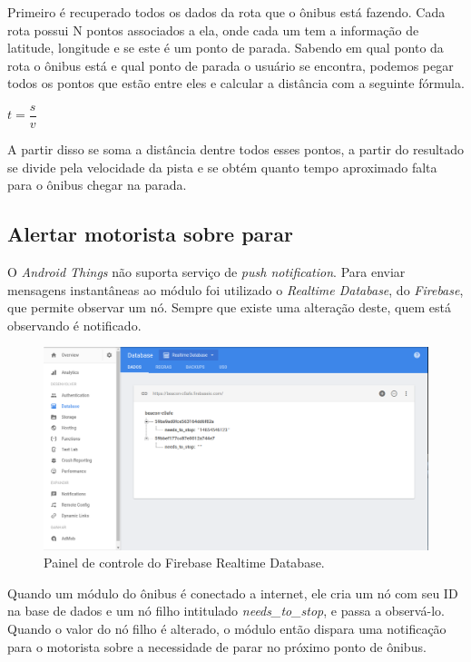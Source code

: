 \documentclass[
	12pt,				%
	oneside,			%
	a4paper,			%
	brazil				%
]{abntex2}
\begin{document}
Primeiro é recuperado todos os dados da rota que o ônibus está fazendo. Cada rota possui N pontos associados a ela, onde cada um tem a informação de latitude, longitude e se este é um ponto de parada. Sabendo em qual ponto da rota o ônibus está e qual ponto de parada o usuário se encontra, podemos pegar todos os pontos que estão entre eles e calcular a distância com a seguinte fórmula.

\begin{center}
$t = \dfrac{s}{v}$ 
\end{center}

A partir disso se soma a distância dentre todos esses pontos, a partir do resultado se divide pela velocidade da pista e se obtém quanto tempo aproximado falta para o ônibus chegar na parada.

\subsection{Alertar motorista sobre parar}

O \textit{Android Things} não suporta serviço de \textit{push notification}. Para enviar mensagens instantâneas ao módulo foi utilizado o \textit{Realtime Database}, do \textit{Firebase}, que permite observar um nó. Sempre que existe uma alteração deste, quem está observando é notificado.

\begin{figure}[H]
\centering
\includegraphics[width=15cm, center]{images/realtime-database}
\caption{Painel de controle do Firebase Realtime Database.}
\label{Rotulo}
\end{figure}

Quando um módulo do ônibus é conectado a internet, ele cria um nó com seu ID na base de dados e um nó filho intitulado \textit{needs\_to\_stop}, e passa a observá-lo. Quando o valor do nó filho é alterado, o módulo então dispara uma notificação para o motorista sobre a necessidade de parar no próximo ponto de ônibus.
\end{document}
